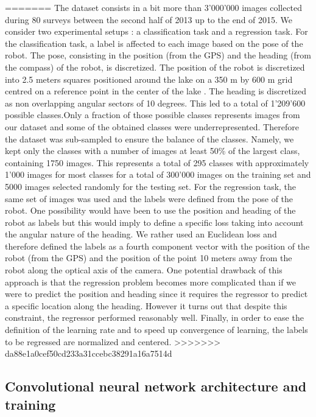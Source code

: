 =======
The dataset consists in a bit more than 3'000'000 images collected during 80 surveys between the second half of 2013 up to the end of 2015. We consider two experimental setups : a classification task and a regression task. For the classification task, a label is affected to each image based on the pose of the robot. The pose, consisting in the position (from the GPS) and the heading (from the compass) of the robot, is discretized. The position of the robot is discretized into 2.5 meters squares positioned around the lake on a 350 m by 600 m grid centred on a reference point in the center of the lake . The heading is discretized as non overlapping angular sectors of 10 degrees. This led to a total of 1'209'600 possible classes.Only a fraction of those possible classes represents images from our dataset and some of the obtained classes were underrepresented. Therefore the dataset was sub-sampled to ensure the balance of the classes. Namely, we kept only the classes with a number of images at least 50\% of the largest class, containing 1750 images. This represents a total of 295 classes with approximately 1'000 images for most classes for a total of 300'000 images on the training set  and 5000 images selected randomly for the testing set. For the regression task, the same set of images was used and the labels were defined from the pose of the robot. One possibility would have been to use the position and heading of the robot as labels but this would imply to define a specific loss taking into account the angular nature of the heading. We rather used an Euclidean loss and therefore defined the labels as a fourth component vector with the position of the robot (from the GPS) and the position of the point 10 meters away from the robot along the optical axis of the camera. One potential drawback of this approach is that the regression problem becomes more complicated than if we were to predict the position and heading since it requires the regressor to predict a specific location along the heading. However it turns out that despite this constraint, the regressor performed reasonably well. Finally, in order to ease the definition of the learning rate and to speed up convergence of learning, the labels to be regressed are normalized and centered.
>>>>>>> da88e1a0cef50cd233a31ccebc38291a16a7514d


\subsection{Convolutional neural network architecture and training}

